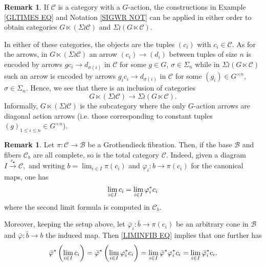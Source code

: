 \documentclass[a4paper,10pt
,draft
]{article}%
\numberwithin{equation}{section}
\numberwithin{figure}{section}
\theoremstyle{definition} %
\newtheorem{remark}[equation]{Remark}%
\newcommand{\C}{\ensuremath{\mathcal C}}
\newcommand{\1}{\ensuremath{\mathbbm 1}}%
\begin{document}
\begin{remark}\label{WRDIAG REM}
If $\mathcal{C}$ is a category with a $G$-action,
the constructions in 
Example \ref{GLTIMES EQ} and Notation \ref{SIGWR NOT}	
can be applied in either order to obtain categories
$G \ltimes (\Sigma \wr \mathcal{C})$
and
$\Sigma \wr (G \ltimes \mathcal{C})$.

In either of these categories, the objects are the tuples
$(c_i)$ with $c_i \in \mathcal{C}$.
%
As for the arrows,
in $G \ltimes (\Sigma \wr \mathcal{C})$
an arrow $(c_i) \to (d_i)$
between tuples of size $n$ is encoded by arrows 
$gc_i \to d_{\sigma(i)}$
in $\C$ for some $g\in G$, $\sigma \in \Sigma_n$
while in $\Sigma \wr (G \ltimes \mathcal{C})$
such an arrow is encoded by arrows
$g_i c_i \to d_{\sigma(i)}$
in $\C$ for some $(g_i) \in G^{\times n}$, $\sigma \in \Sigma_n$.
Hence, we see that there is an inclusion of categories
	\begin{equation} 
	G \ltimes (\Sigma \wr \mathcal C) \to \Sigma \wr (G \ltimes \mathcal C).
	\end{equation}
Informally, $G \ltimes (\Sigma \wr \mathcal C)$
is the subcategory where the only
$G$-action arrows are diagonal action arrows
(i.e. those corresponding to constant tuples $(g)_{1 \leq i \leq n} \in G^{\times n}$).
\end{remark}



\begin{remark}
Let $\pi \colon \mathcal{C} \to \mathcal{B}$ be a Grothendieck fibration.
Then, if the base $\mathcal{B}$ and fibers 
$\mathcal{C}_b$
are all complete, so is the total category $\mathcal{C}$.
%
Indeed, given a diagram $I \xrightarrow{c_{\bullet}} \mathcal{C}$,\
and writing
$b = \lim_{i \in I} \pi(c_i)$
and 
$\varphi_i \colon b \to \pi(c_i)$
for the canonical maps,
one has
\begin{equation}\label{LIMINFIB EQ}
\lim_{i \in I} c_i = 
\lim_{i \in I} \varphi_{i}^{\**}c_i
\end{equation}
where the second limit formula is computed in $\mathcal{C}_b$.

Moreover, keeping the setup above, let $\bar{\varphi}_i \colon \bar{b} \to \pi(c_i)$
be an arbitrary cone in $\mathcal{B}$
and $\bar{\varphi} \colon \bar{b} \to b$
the induced map.
Then \eqref{LIMINFIB EQ} implies that one further has
\begin{equation}\label{LIMINFIBSUP EQ}
\bar{\varphi}^{\**}\left(\lim_{i \in I} c_i\right) 
	= 
\bar{\varphi}^{\**}\left(\lim_{i \in I} \varphi_{i}^{\**}c_i\right)
	=
\lim_{i \in I} \bar{\varphi}^{\**} \varphi_{i}^{\**}c_i
	=
\lim_{i \in I} \bar{\varphi}_{i}^{\**}c_i.
\end{equation}
\end{remark}
\end{document}
